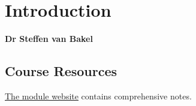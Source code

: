\chapter{Introduction}
\begin{center}
    \centerline{\textbf{Dr Steffen van Bakel}}
\end{center}

\section{Course Resources}
\href{https://www.doc.ic.ac.uk/~svb/TSfPL/}{The module website} contains comprehensive notes.

